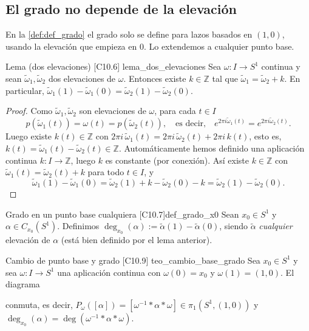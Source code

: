 \subsection{El grado no depende de la elevación}

En la \cref{def:def_grado} el grado solo se define para lazos basados en $(1,0)$, usando la elevación que empieza en $0$. Lo extendemos a cualquier punto base.

\begin{proposicion}{Lema (dos elevaciones) [C10.6] \marcaP}{lema_dos_elevaciones}
Sea $\omega \colon I \to S^1$ continua y sean $\tilde{\omega}_1, \tilde{\omega}_2$ dos elevaciones de $\omega$. Entonces existe $k \in \mathbb{Z}$ tal que $\tilde{\omega}_1 = \tilde{\omega}_2 + k$. En particular, $\tilde{\omega}_1(1) - \tilde{\omega}_1(0) = \tilde{\omega}_2(1) - \tilde{\omega}_2(0)$.
\end{proposicion}

\begin{proof}
Como $\tilde{\omega}_1,\tilde{\omega}_2$ son elevaciones de $\omega$, para cada $t \in I$
\[ p(\tilde{\omega}_1(t)) = \omega(t) = p(\tilde{\omega}_2(t)), \quad\text{es decir,}\quad e^{2\pi i \tilde{\omega}_1(t)} = e^{2\pi i \tilde{\omega}_2(t)}. \]
Luego existe $k(t) \in \mathbb{Z}$ con $2\pi i\,\tilde{\omega}_1(t) = 2\pi i\,\tilde{\omega}_2(t) + 2\pi i\,k(t)$, esto es, $k(t) = \tilde{\omega}_1(t) - \tilde{\omega}_2(t) \in \mathbb{Z}$. Automáticamente hemos definido una aplicación continua $k \colon I \to \mathbb{Z}$, luego $k$ es constante (por conexión). Así existe $k \in \mathbb{Z}$ con $\tilde{\omega}_1(t) = \tilde{\omega}_2(t) + k$ para todo $t \in I$, y
\[ \tilde{\omega}_1(1) - \tilde{\omega}_1(0) = \tilde{\omega}_2(1) + k - \tilde{\omega}_2(0) - k = \tilde{\omega}_2(1) - \tilde{\omega}_2(0). \]
\end{proof}

\begin{definicion}{Grado en un punto base cualquiera [C10.7]}{def_grado_x0}
Sean $x_0 \in S^1$ y $\alpha \in C_{x_0}(S^1)$. Definimos $\deg_{x_0}(\alpha) := \tilde{\alpha}(1) - \tilde{\alpha}(0)$, siendo $\tilde{\alpha}$ \emph{cualquier} elevación de $\alpha$ (está bien definido por el lema anterior).
\end{definicion}

\begin{teorema}{Cambio de punto base y grado [C10.9] \marcaE}{teo_cambio_base_grado}
Sea $x_0 \in S^1$ y sea $\omega \colon I \to S^1$ una aplicación continua con $\omega(0) = x_0$ y $\omega(1) = (1,0)$. El diagrama
\begin{center}
\end{center}
conmuta, es decir, $P_\omega([\alpha]) = [\omega^{-1} * \alpha * \omega] \in \pi_1(S^1,(1,0))$ y $\deg_{x_0}(\alpha) = \deg(\omega^{-1} * \alpha * \omega)$.
\end{teorema}

